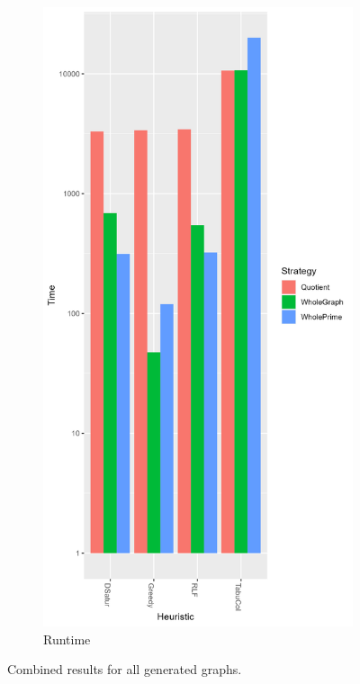 \documentclass[a4paper]{article}
\begin{document}
\begin{figure}[p]
\begin{subfigure}{.4\paperwidth}
    \end{subfigure}%
    \begin{subfigure}{.4\paperwidth}
        \includegraphics[width=\columnwidth]{Tables/GeneratedTime.png}
      \caption{Runtime}
      \label{fig:generatedt}
    \end{subfigure}
\caption{Combined results for all generated graphs. \figdesc}
\label{fig:generated}
\end{figure}
\end{document}

